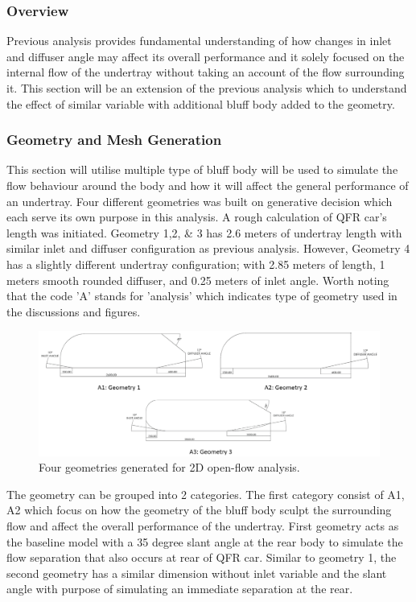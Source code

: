 \subsubsection{Overview}
Previous analysis provides fundamental understanding of how changes in inlet and diffuser angle may affect its overall performance and it solely focused on the internal flow of the undertray without taking an account of the flow surrounding it. This section will be an extension of the previous analysis which to understand the effect of similar variable with additional bluff body added to the geometry. 

\subsubsection{Geometry and Mesh Generation}
This section will utilise multiple type of bluff body will be used to simulate the flow behaviour around the body and how it will affect the general performance of an undertray. Four different geometries was built on generative decision which each serve its own purpose in this analysis. A rough calculation of QFR car's length was initiated. Geometry 1,2, \& 3 has 2.6 meters of undertray length with similar inlet and diffuser configuration as previous analysis. However, Geometry 4 has a slightly different undertray configuration; with 2.85 meters of length, 1 meters smooth rounded diffuser, and 0.25 meters of inlet angle. Worth noting that the code 'A' stands for 'analysis' which indicates type of geometry used in the discussions and figures.

\begin{figure}[!ht]
    \centering
    \includegraphics[scale = 0.5]{Figures/2D_OF/2D_OF_GEOM.png}
    \caption{Four geometries generated for 2D open-flow analysis.}
    \label{fig:2D_OF_GEOM}
\end{figure}

\noindent The geometry can be grouped into 2 categories. The first category consist of A1, A2 which focus on how the geometry of the bluff body sculpt the surrounding flow and affect the overall performance of the undertray. First geometry acts as the baseline model with a 35 degree slant angle at the rear body to simulate the flow separation that also occurs at rear of QFR car. Similar to geometry 1, the second geometry has a similar dimension without inlet variable and the slant angle with purpose of simulating an immediate separation at the rear.

